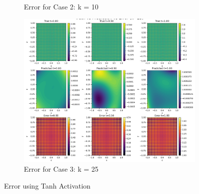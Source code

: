 \documentclass[11pt]{article}
\begin{document}
\begin{figure}[h!]
\begin{subfigure}[b]{0.48\textwidth}
        \caption{Error for Case 2: k = 10}
        \label{fig:Error_K2}
    \end{subfigure}
    \hfill
    \begin{subfigure}[b]{0.48\textwidth}
        \includegraphics[width=\textwidth]{2D_Error_K3.png}
        \caption{Error for Case 3: k = 25}
        \label{fig:Error_K3}
    \end{subfigure}
    \caption{Error using Tanh Activation}
    \label{fig:Error_Tanh}
\end{figure}
\pagebreak
\end{document}
